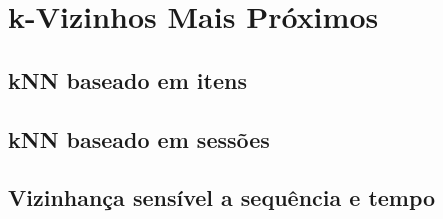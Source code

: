 \section{k-Vizinhos Mais Próximos}
\subsection{kNN baseado em itens}
\subsection{kNN baseado em sessões}
\subsection{Vizinhança sensível a sequência e tempo}
